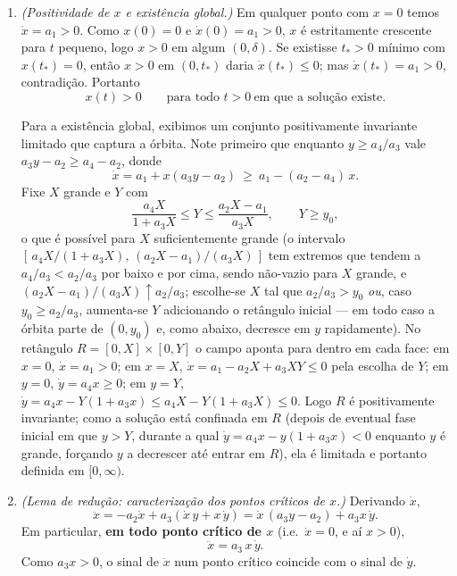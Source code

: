 \begin{enumerate}[label=(\alph*)]

\item \emph{(Positividade de $x$ e existência global.)}
Em qualquer ponto com $x=0$ temos $\dot x=a_1>0$. Como $x(0)=0$ e $\dot x(0)=a_1>0$, $x$ é estritamente crescente para $t$ pequeno, logo $x>0$ em algum $(0,\delta)$. Se existisse $t_*>0$ mínimo com $x(t_*)=0$, então $x>0$ em $(0,t_*)$ daria $\dot x(t_*)\le0$; mas $\dot x(t_*)=a_1>0$, contradição. Portanto
\[
x(t)>0\qquad\text{para todo }t>0\ \text{em que a solução existe.}
\]

Para a existência global, exibimos um conjunto positivamente invariante limitado que captura a órbita. Note primeiro que enquanto $y\ge a_4/a_3$ vale $a_3y-a_2\ge a_4-a_2$, donde
\begin{equation}\label{eq:xdotlb30}
\dot x=a_1+x(a_3y-a_2)\ \ge\ a_1-(a_2-a_4)\,x .
\end{equation}
Fixe $X$ grande e $Y$ com
\[
\frac{a_4X}{1+a_3X}\le Y\le \frac{a_2X-a_1}{a_3X},\qquad Y\ge y_0 ,
\]
o que é possível para $X$ suficientemente grande (o intervalo $[\,a_4X/(1+a_3X),\,(a_2X-a_1)/(a_3X)\,]$ tem extremos que tendem a $a_4/a_3<a_2/a_3$ por baixo e por cima, sendo não-vazio para $X$ grande, e $(a_2X-a_1)/(a_3X)\uparrow a_2/a_3$; escolhe-se $X$ tal que $a_2/a_3>y_0$ \emph{ou}, caso $y_0\ge a_2/a_3$, aumenta-se $Y$ adicionando o retângulo inicial — em todo caso a órbita parte de $(0,y_0)$ e, como abaixo, decresce em $y$ rapidamente). No retângulo $R=[0,X]\times[0,Y]$ o campo aponta para dentro em cada face: em $x=0$, $\dot x=a_1>0$; em $x=X$, $\dot x=a_1-a_2X+a_3XY\le0$ pela escolha de $Y$; em $y=0$, $\dot y=a_4x\ge0$; em $y=Y$, $\dot y=a_4x-Y(1+a_3x)\le a_4X-Y(1+a_3X)\le0$. Logo $R$ é positivamente invariante; como a solução está confinada em $R$ (depois de eventual fase inicial em que $y>Y$, durante a qual $\dot y=a_4x-y(1+a_3x)<0$ enquanto $y$ é grande, forçando $y$ a decrescer até entrar em $R$), ela é limitada e portanto definida em $[0,\infty)$.

\item \emph{(Lema de redução: caracterização dos pontos críticos de $x$.)}
Derivando $\dot x$,
\[
\ddot x=-a_2\dot x+a_3(\dot x\,y+x\,\dot y)=\dot x\,(a_3y-a_2)+a_3x\,\dot y .
\]
Em particular, \textbf{em todo ponto crítico de $x$} (i.e.\ $\dot x=0$, e aí $x>0$),
\begin{equation}\label{eq:xddot30}
\ddot x=a_3\,x\,\dot y .
\end{equation}
Como $a_3x>0$, o sinal de $\ddot x$ num ponto crítico coincide com o sinal de $\dot y$.


\end{enumerate}
